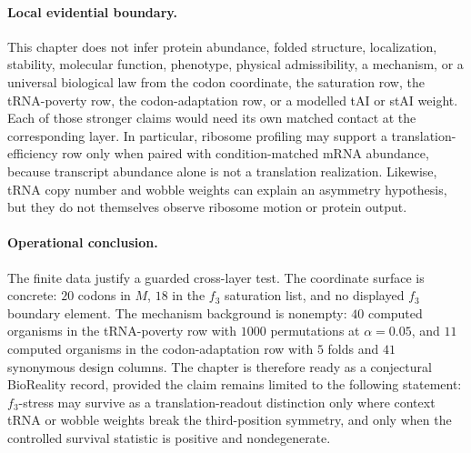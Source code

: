 \paragraph{Local evidential boundary.}
This chapter does not infer protein abundance, folded structure, localization, stability, molecular function, phenotype, physical admissibility, a mechanism, or a universal biological law from the codon coordinate, the saturation row, the tRNA-poverty row, the codon-adaptation row, or a modelled tAI or stAI weight. Each of those stronger claims would need its own matched contact at the corresponding layer. In particular, ribosome profiling may support a translation-efficiency row only when paired with condition-matched mRNA abundance, because transcript abundance alone is not a translation realization. Likewise, tRNA copy number and wobble weights can explain an asymmetry hypothesis, but they do not themselves observe ribosome motion or protein output.

\paragraph{Operational conclusion.}
The finite data justify a guarded cross-layer test. The coordinate surface is concrete: $20$ codons in $M$, $18$ in the $f_3$ saturation list, and no displayed $f_3$ boundary element. The mechanism background is nonempty: $40$ computed organisms in the tRNA-poverty row with $1000$ permutations at $\alpha=0.05$, and $11$ computed organisms in the codon-adaptation row with $5$ folds and $41$ synonymous design columns. The chapter is therefore ready as a conjectural BioReality record, provided the claim remains limited to the following statement: $f_3$-stress may survive as a translation-readout distinction only where context tRNA or wobble weights break the third-position symmetry, and only when the controlled survival statistic is positive and nondegenerate.
